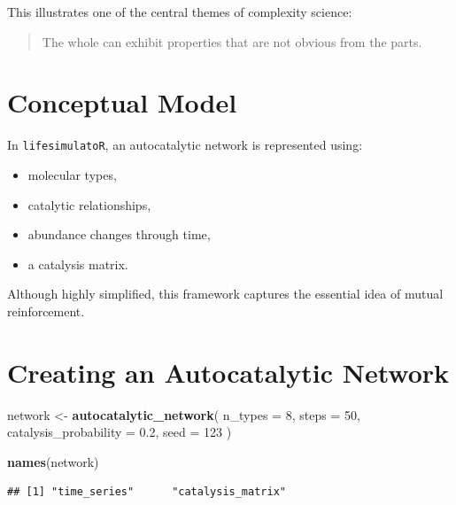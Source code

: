 \documentclass[
  oneside,
  openany]{book}
\newenvironment{Shaded}{\begin{snugshade}}{\end{snugshade}}
\newcommand{\AttributeTok}[1]{\textcolor[rgb]{0.13,0.29,0.53}{#1}}
\newcommand{\DecValTok}[1]{\textcolor[rgb]{0.00,0.00,0.81}{#1}}
\newcommand{\FloatTok}[1]{\textcolor[rgb]{0.00,0.00,0.81}{#1}}
\newcommand{\FunctionTok}[1]{\textcolor[rgb]{0.13,0.29,0.53}{\textbf{#1}}}
\newcommand{\NormalTok}[1]{#1}
\newcommand{\OtherTok}[1]{\textcolor[rgb]{0.56,0.35,0.01}{#1}}
\newcommand{\SpecialCharTok}[1]{\textcolor[rgb]{0.81,0.36,0.00}{\textbf{#1}}}
\providecommand{\tightlist}{%
  \setlength{\itemsep}{0pt}\setlength{\parskip}{0pt}}
\begin{document}
This illustrates one of the central themes of complexity science:

\begin{quote}
The whole can exhibit properties that are not obvious from the parts.
\end{quote}

\section{Conceptual Model}\label{conceptual-model-4}

In \texttt{lifesimulatoR}, an autocatalytic network is represented using:

\begin{itemize}
\tightlist
\item
  molecular types,
\item
  catalytic relationships,
\item
  abundance changes through time,
\item
  a catalysis matrix.
\end{itemize}

Although highly simplified, this framework captures the essential idea of mutual reinforcement.

\section{Creating an Autocatalytic Network}\label{creating-an-autocatalytic-network}

\begin{Shaded}
\begin{Highlighting}[]
\NormalTok{network }\OtherTok{\textless{}{-}} \FunctionTok{autocatalytic\_network}\NormalTok{(}
  \AttributeTok{n\_types =} \DecValTok{8}\NormalTok{,}
  \AttributeTok{steps =} \DecValTok{50}\NormalTok{,}
  \AttributeTok{catalysis\_probability =} \FloatTok{0.2}\NormalTok{,}
  \AttributeTok{seed =} \DecValTok{123}
\NormalTok{)}

\FunctionTok{names}\NormalTok{(network)}
\end{Highlighting}
\end{Shaded}

\begin{verbatim}
## [1] "time_series"      "catalysis_matrix"
\end{verbatim}

\begin{Shaded}
\end{Shaded}
\end{document}
